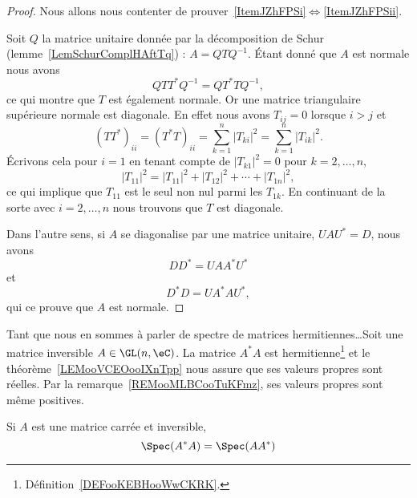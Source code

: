 \begin{proof}
    Nous allons nous contenter de prouver~\ref{ItemJZhFPSi}\( \Leftrightarrow\)\ref{ItemJZhFPSii}.

    Soit \( Q\) la matrice unitaire donnée par la décomposition de Schur (lemme~\ref{LemSchurComplHAftTq}) : \( A=QTQ^{-1}\). Étant donné que \( A\) est normale nous avons
    \begin{equation}
        QTT^*Q^{-1}=QT^*TQ^{-1},
    \end{equation}
    ce qui montre que \( T\) est également normale. Or une matrice triangulaire supérieure normale est diagonale. En effet nous avons \( T_{ij}=0\) lorsque \( i>j\) et
    \begin{equation}
        (TT^*)_{ii}=(T^*T)_{ii}=\sum_{k=1}^n| T_{ki} |^2=\sum_{k=1}^n| T_{ik} |^2.
    \end{equation}
    Écrivons cela pour \( i=1\) en tenant compte de \( | T_{k1} |^2=0\) pour \( k=2,\ldots, n\),
    \begin{equation}
        | T_{11} |^2=| T_{11} |^2+| T_{12} |^2+\cdots+| T_{1n} |^2,
    \end{equation}
    ce qui implique que \( T_{11}\) est le seul non nul parmi les \( T_{1k}\). En continuant de la sorte avec \( i=2,\ldots, n\) nous trouvons que \( T\) est diagonale.

    Dans l'autre sens, si \( A\) se diagonalise par une matrice unitaire, \( UAU^*=D\), nous avons
    \begin{equation}
        DD^*=UAA^*U^*
    \end{equation}
    et
    \begin{equation}
        D^*D=UA^*AU^*,
    \end{equation}
    qui ce prouve que \( A\) est normale.
\end{proof}

Tant que nous en sommes à parler de spectre de matrices hermitiennes\ldots Soit une matrice inversible \( A\in \GL(n,\eC)\). La matrice \( A^*A\) est hermitienne\footnote{Définition~\ref{DEFooKEBHooWwCKRK}.} et le théorème~\ref{LEMooVCEOooIXnTpp} nous assure que ses valeurs propres sont réelles. Par la remarque~\ref{REMooMLBCooTuKFmz}, ses valeurs propres sont même positives.

\begin{lemma}   \label{LEMooHUGEooVYhZdZ}
    Si \( A\) est une matrice carrée et inversible,
    \begin{equation}
        \Spec(A^*A)=\Spec(AA^*)
    \end{equation}
\end{lemma}

